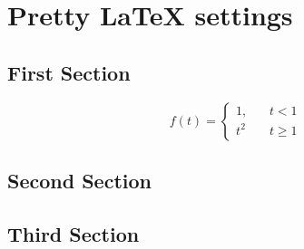 \documentclass[12pt,a4paper,twoside]{article}
\begin{document}
 
\section{Pretty \LaTeX{}  settings}\thispagestyle{FooBar}
 
\lipsum[1-2] 

 
 \lipsum[3-5] 
 
\subsection{First Section}

\lipsum[1]
\begin{equation}
f(t)=\left\{ \begin{array}{ll}
1,~~~~ & t< 1 \\
t^2 & t\geq 1

\end{array}\right.
\end{equation}
 
\lipsum[3-7]

\subsection{Second Section}

\lipsum[4-8]

\subsection{Third Section}

\lipsum[6-10]
 
\end{document}
